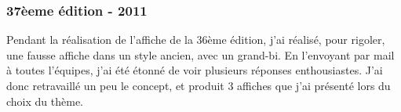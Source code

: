         \subsubsection{37èeme édition - 2011}            
            
            \begin{center}        
            \end{center}
            Pendant la réalisation de l'affiche de la 36ème édition, j'ai réalisé, pour rigoler, une fausse affiche dans un style ancien, avec un grand-bi. En l'envoyant par mail à toutes l'équipes, j'ai été étonné de voir plusieurs réponses enthousiastes.
                J'ai donc retravaillé un peu le concept, et produit 3 affiches que j'ai présenté lors du choix du thème.            
            
